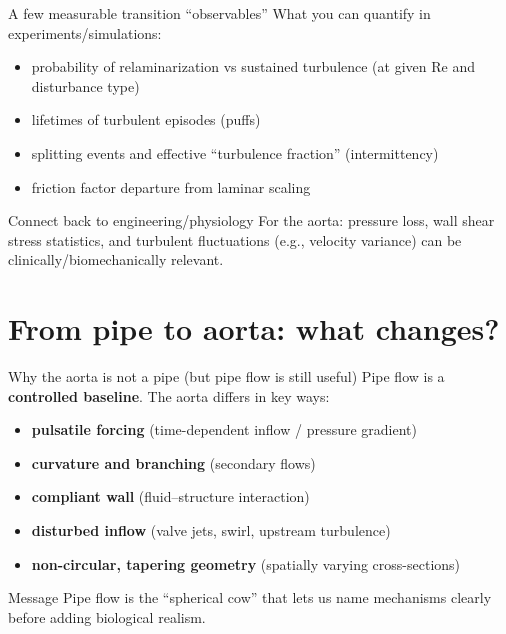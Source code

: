 \documentclass[aspectratio=169]{beamer}
\newcommand{\Rey}{\mathrm{Re}}
\begin{document}
\begin{frame}{A few measurable transition ``observables''}
What you can quantify in experiments/simulations:
\begin{itemize}
  \item probability of relaminarization vs sustained turbulence (at given $\Rey$ and disturbance type)
  \item lifetimes of turbulent episodes (puffs)
  \item splitting events and effective ``turbulence fraction'' (intermittency)
  \item friction factor departure from laminar scaling
\end{itemize}

\begin{block}{Connect back to engineering/physiology}
For the aorta: pressure loss, wall shear stress statistics, and turbulent fluctuations (e.g., velocity variance) can be clinically/biomechanically relevant.
\end{block}
\end{frame}

\section{From pipe to aorta: what changes?}

\begin{frame}{Why the aorta is not a pipe (but pipe flow is still useful)}
Pipe flow is a \textbf{controlled baseline}. The aorta differs in key ways:
\begin{itemize}
  \item \textbf{pulsatile forcing} (time-dependent inflow / pressure gradient)
  \item \textbf{curvature and branching} (secondary flows)
  \item \textbf{compliant wall} (fluid--structure interaction)
  \item \textbf{disturbed inflow} (valve jets, swirl, upstream turbulence)
  \item \textbf{non-circular, tapering geometry} (spatially varying cross-sections)
\end{itemize}

\begin{block}{Message}
Pipe flow is the ``spherical cow'' that lets us name mechanisms clearly before adding biological realism.
\end{block}
\end{frame}
\end{document}
